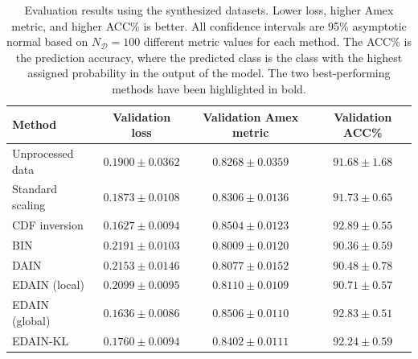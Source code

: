 \documentclass{statsmsc}
\begin{document}
{%
\begin{table}[htp]
    \centering
    \begin{tabular}{l|ccc}
        \toprule
        Method        & Validation loss &     Validation Amex metric &            Validation ACC\% \\
        \midrule
        Unprocessed data   & $0.1900 \pm 0.0362$           & $0.8268 \pm 0.0359$          & $91.68 \pm 1.68$           \\
        Standard scaling   & $0.1873 \pm 0.0108$           & $0.8306 \pm 0.0136$          & $91.73 \pm 0.65$          \\
        \ac{CDF} inversion & $\mathbf{ 0.1627 \pm 0.0094}$ & $\mathbf{0.8504 \pm 0.0123}$          & $\mathbf{92.89 \pm 0.55}$ \\
        BIN                & $0.2191 \pm 0.0103$           & $0.8009 \pm 0.0120$          & $90.36 \pm 0.59$          \\
        DAIN               & $0.2153 \pm 0.0146$           & $0.8077 \pm 0.0152$          & $90.48 \pm 0.78$          \\
        EDAIN (local)      & $0.2099 \pm 0.0095$           & $0.8110 \pm 0.0109$          & $90.71 \pm 0.57$          \\
        EDAIN (global)     & $\mathbf{0.1636 \pm 0.0086}$           & $\mathbf{0.8506 \pm 0.0110}$ & $\mathbf{92.83 \pm 0.51}$          \\
        EDAIN-KL           & $0.1760 \pm 0.0094$           & $0.8402 \pm 0.0111$          & $92.24 \pm 0.59$          \\
        \bottomrule
    \end{tabular}%
    \caption{
        Evaluation results using the synthesized datasets. Lower loss, 
        higher Amex metric, and higher ACC\% is better. All confidence intervals are 95\% asymptotic
        normal based on $N_{\mathcal{D}}=100$ different metric values for
        each method. The ACC\% is the prediction accuracy, where the predicted class is the
        class with the highest assigned probability in the output of the model.
        The two best-performing methods have been highlighted in bold.
    }%
    \label{tab:synth_results}
\end{table}

}
\end{document}
